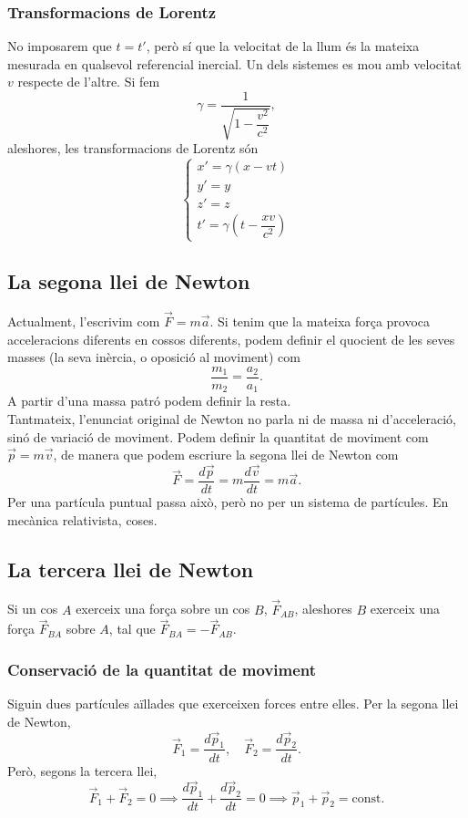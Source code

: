 \subsubsection{Transformacions de Lorentz}
No imposarem que $t=t'$, però sí que la velocitat de la llum és la mateixa mesurada en qualsevol referencial inercial. Un dels sistemes es mou amb velocitat $v$ respecte de l'altre.
Si fem 
\[
\gamma=\dfrac{1}{\sqrt{1-\dfrac{v^2}{c^2}}},
\]
aleshores, les transformacions de Lorentz són
\[\begin{cases}x'=\gamma(x-vt)\\ y'=y\\ z'=z\\ t'=
\gamma(t-\dfrac{xv}{c^2})
\end{cases}\]

\subsection{La segona llei de Newton}
Actualment, l'escrivim com $\vec F=m\vec a$. Si tenim que la mateixa força provoca acceleracions diferents en cossos diferents, podem definir el quocient de les seves masses (la seva inèrcia, o oposició al moviment) com
\[\dfrac{m_1}{m_2}=\dfrac{a_2}{a_1}.\]
A partir d'una massa patró podem definir la resta.\\
Tantmateix, l'enunciat original de Newton no parla ni de massa ni d'acceleració, sinó de variació de moviment. Podem definir la quantitat de moviment com $\vec p=m\vec v$, de manera que podem escriure la segona llei de Newton com
\[\vec F=\dfrac{d\vec p}{dt}=m\dfrac{d\vec v}{dt}=m\vec a.\]
Per una partícula puntual passa això, però no per un sistema de partícules. En mecànica relativista, coses.

\subsection{La tercera llei de Newton}
Si un cos $A$ exerceix una força sobre un cos $B$, $\vec F_{AB}$, aleshores $B$ exerceix una força $\vec F_{BA}$ sobre $A$, tal que $\vec F_{BA}=-\vec F_{AB}$.
\subsubsection{Conservació de la quantitat de moviment}
Siguin dues partícules aïllades que exerceixen forces entre elles. Per la segona llei de Newton,
\[\vec F_1=\dfrac{d\vec p_1}{dt},\quad\vec F_2=\dfrac{d\vec p_2}{dt}.\]
Però, segons la tercera llei,
\[\vec F_1+\vec F_2=0\implies\dfrac{d\vec p_1}{dt}+\dfrac{d\vec p_2}{dt}=0\implies\vec p_1+\vec p_2=\text{const}.\]

